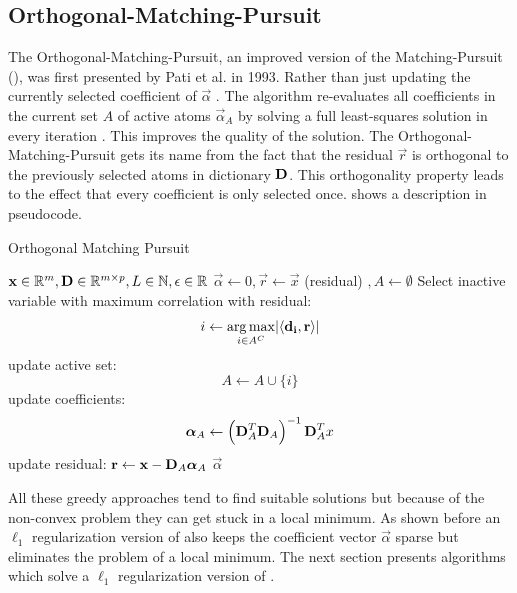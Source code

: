 \subsection{Orthogonal-Matching-Pursuit}
\label{sec:omp}
The Orthogonal-Matching-Pursuit, an improved version of
the Matching-Pursuit (), was first presented by Pati et al.
in 1993\cite{Pati1993}. Rather than just updating the currently selected
coefficient of $\vec{\alpha}$ . The algorithm
re-evaluates
all coefficients in the current set $A$ of active atoms $\vec{\alpha}_A$ by
solving a full least-squares solution in every iteration
.
This improves the quality of the solution\cite{Pati1993}. The
Orthogonal-Matching-Pursuit gets its name from the fact that the residual
$\vec{r}$ is orthogonal to the previously selected atoms in dictionary
$\boldsymbol{\mathrm{D}}$. This orthogonality property leads to the effect that every
coefficient is only selected once.  shows a
description in pseudocode.

\begin{algorithm}[h]
\caption{Orthogonal Matching Pursuit}
\label{alg:omp}
\begin{algorithmic}[1]
\REQUIRE $\boldsymbol{\mathrm{x}} \in \mathbb{R}^m, \boldsymbol{\mathrm{D}} \in \mathbb{R}^{m\times p}, L \in
\mathbb{N}, \epsilon \in \mathbb{R}$
\STATE $\vec{\alpha} \gets 0, \vec{r} \gets \vec{x} $ (residual) $, A \gets
\emptyset$
\STATE Select inactive variable with maximum correlation with residual: 
\begin{equation*}
i \gets \operatorname*{arg\,max}_{i \in A^C} \lvert \left<\boldsymbol{\mathrm{d_i}},\boldsymbol{\mathrm{r}}\right> \rvert
\end{equation*}
\STATE update active set:
\begin{equation*}
 A \gets A \cup \{i\} 
\end{equation*}
\STATE update coefficients: 
\begin{align}
\boldsymbol{\mathrm{\alpha}}_A \gets \left( \boldsymbol{\mathrm{D}}_A^T \boldsymbol{\mathrm{D}}_A \right)^{-1} \boldsymbol{\mathrm{D}}_A^T x 
\label{eq:omp_update}
\end{align}\label{alg:OMP_DTD}
\STATE update residual: $\boldsymbol{\mathrm{r}} \gets \boldsymbol{\mathrm{x}}-\boldsymbol{\mathrm{D}}_A\boldsymbol{\mathrm{\alpha}}_A$
\ENDFOR
\RETURN $\vec{\alpha}$
\end{algorithmic}
\end{algorithm}

All these greedy approaches tend to find suitable solutions but
because of the non-convex problem they can get stuck in a local minimum. As
shown before an $\ell_1$ regularization version of  also
keeps
the coefficient vector $\vec{\alpha}$ sparse but eliminates the problem of a
local minimum. The next section presents algorithms which solve  a $\ell_1$
regularization version of .


